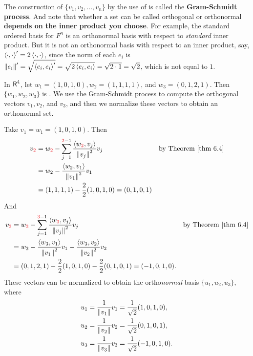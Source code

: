 \begin{remark} \label{remark 6.2.3}
The construction of \(\{ v_1, v_2, ..., v_n \}\) by the use of  is called the \textbf{Gram-Schmidt process}.
And note that whether a set can be called orthogonal or orthonormal \textbf{depends on the inner product you choose}.
For example, the standard ordered basis for \(F^n\) is an orthonormal basis with respect to \emph{standard} inner product.
But it is not an orthonormal basis with respect to an inner product, say, \(\left< \cdot, \cdot \right>' = 2 \left< \cdot, \cdot \right>\), since the norm of each \(e_i\) is \(\left\lVert e_i\right\rVert' = \sqrt{\left< e_i, e_i \right>'} = \sqrt{2 \left< e_i, e_i \right> } = \sqrt{2 \cdot 1} = \sqrt{2}\), which is not equal to \(1\).
\end{remark}

\begin{example} \label{example 6.2.4}
In \(\textsf{R}^4\), let \(w_1 = (1, 0, 1, 0), w_2 = (1, 1, 1, 1)\), and \(w_3 = (0, 1, 2, 1)\).
Then \(\{ w_1, w_2, w_3 \}\) is \LID{}.
We use the Gram-Schmidt process to compute the orthogonal vectors \(v_1, v_2\), and \(v_3\), and then we normalize these vectors to obtain an orthonormal set.

Take \(v_1 = w_1 = (1, 0, 1, 0)\).
Then
\begin{align*}
    v_{\RED{2}} & = w_{\RED{2}} - \sum_{j = 1}^{\RED{2} - 1} \frac{\LG w_{\RED{2}}, v_j \RG}{\norm{v_j}^2} v_j & \text{by \THM{6.4}} \\
        & = w_2 - \frac{\LG w_2, v_1 \RG}{\norm{v_1}^2} v_1 \\
        & = (1, 1, 1, 1) - \frac{2}{2}(1, 0, 1, 0) = (0, 1, 0, 1)
\end{align*}
And
\begin{align*}
    v_{\RED{3}} & = w_{\RED{3}} - \sum_{j = 1}^{\RED{3} - 1} \frac{\LG w_{\RED{3}}, v_j \RG}{\norm{v_j}^2} v_j & \text{by \THM{6.4}} \\
        & = w_3 - \frac{\LG w_3, v_1 \RG}{\norm{v_1}^2} v_1 - \frac{\LG w_3, v_2 \RG}{\norm{v_2}^2} v_2 \\
        & = (0, 1, 2, 1) - \frac{2}{2} (1, 0, 1, 0) - \frac{2}{2} (0, 1, 0, 1) = (-1, 0, 1, 0).
\end{align*}
These vectors can be normalized to obtain the ortho\emph{normal} basis \(\{ u_1, u_2, u_3 \}\), where
\begin{align*}
    u_1 & = \frac{1}{\left\lVert v_1\right\rVert} v_1 = \frac{1}{\sqrt{2}}(1, 0, 1, 0), \\
    u_2 & = \frac{1}{\left\lVert v_2\right\rVert} v_2 = \frac{1}{\sqrt{2}}(0, 1, 0, 1), \\
    u_3 & = \frac{1}{\left\lVert v_3\right\rVert} v_3 = \frac{1}{\sqrt{2}}(-1, 0, 1, 0).
\end{align*}
\end{example}

